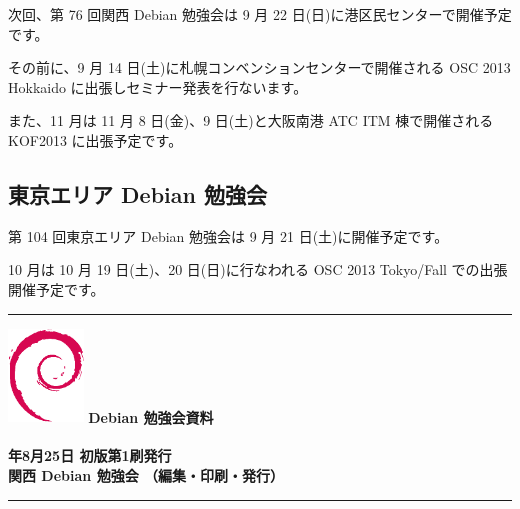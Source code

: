 \documentclass[mingoth,a4paper]{jsarticle}
\newcommand{\debmtgyear}{2013}
\newcommand{\debmtgdate}{25}
\newcommand{\debmtgmonth}{8}
\begin{document}
次回、第 76 回関西 Debian 勉強会は 9 月 22 日(日)に港区民センターで開催予定です。

その前に、9 月 14 日(土)に札幌コンベンションセンターで開催される OSC 2013 Hokkaido に出張しセミナー発表を行ないます。

また、11 月は 11 月 8 日(金)、9 日(土)と大阪南港 ATC ITM 棟で開催される KOF2013 に出張予定です。


\subsection{東京エリア Debian 勉強会}

第 104 回東京エリア Debian 勉強会は 9 月 21 日(土)に開催予定です。

10 月は 10 月 19 日(土)、20 日(日)に行なわれる OSC 2013 Tokyo/Fall での出張開催予定です。

%
 \mbox{}\newpage
 \mbox{}\newpage
 \mbox{}\newpage

\printindex

 \begin{minipage}[b]{0.2\hsize}
 \end{minipage}
 \begin{minipage}[b]{0.8\hsize}

 \vspace*{15cm}
 \rule{\hsize}{1mm}
 \vspace{2mm}
 \includegraphics[width=2cm]{image200502/openlogo-nd.eps}
 \noindent \Large \bf Debian 勉強会資料\\ \\
 \noindent \normalfont \debmtgyear{}年\debmtgmonth{}月\debmtgdate{}日 \hspace{5mm}  初版第1刷発行\\
 \noindent \normalfont 関西 Debian 勉強会 （編集・印刷・発行）\\
 \rule{\hsize}{1mm}
 \end{minipage}
\end{document}
